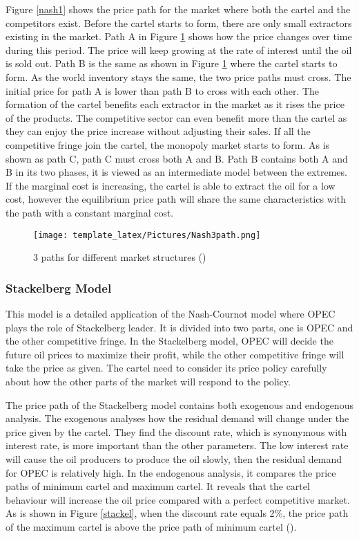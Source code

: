 Figure \ref{nash1} shows the price path for the market where both the cartel and the competitors exist. Before the cartel starts to form, there are only small extractors existing in the market. Path A in Figure \ref{nash2} shows how the price changes over time during this period. The price will keep growing at the rate of interest until the oil is sold out. Path B is the same as shown in Figure \ref{nash2} where the cartel starts to form. As the world inventory stays the same, the two price paths must cross. The initial price for path A is lower than path B to cross with each other. The formation of the cartel benefits each extractor in the market as it rises the price of the products. The competitive sector can even benefit more than the cartel as they can enjoy the price increase without adjusting their sales. If all the competitive fringe join the cartel, the monopoly market starts to form. As is shown as path C, path C must cross both A and B. Path B contains both A and B in its two phases, it is viewed as an intermediate model between the extremes. If the marginal cost is increasing, the cartel is able to extract the oil for a low cost, however the equilibrium price path will share the same characteristics with the path with a constant marginal cost.
\begin{figure}[h]
\texttt{[image: template\_latex/Pictures/Nash3path.png]}
\centering
\caption{3 paths for different market structures (\cite{salant1976exhaustible})}
\label{nash2}
\end{figure}


\subsubsection{Stackelberg Model}
This model is a detailed application of the Nash-Cournot model  where OPEC plays the role of Stackelberg leader. It is divided into two parts, one is OPEC and the other competitive fringe. In the Stackelberg model, OPEC will decide the future oil prices to maximize their profit, while the other competitive fringe will take the price as given. The cartel need to consider its price policy carefully about how the other parts of the market will respond to the policy.

The price path of the Stackelberg model contains both exogenous and endogenous analysis. The exogenous analyses how the residual demand will change under the price given by the cartel. They find the discount rate, which is synonymous with interest rate, is more important than the other parameters. The low interest rate will cause the oil producers to produce the oil slowly, then the residual demand for OPEC is relatively high. In the endogenous analysis, it compares the price paths of minimum cartel and maximum cartel. It reveals that the cartel behaviour will increase the oil price compared with a perfect competitive market. As is shown in Figure \ref{stackel}, when the discount rate equals 2\%, the price path of the maximum cartel is above the price path of minimum cartel (\cite{marshalla1986future}).

